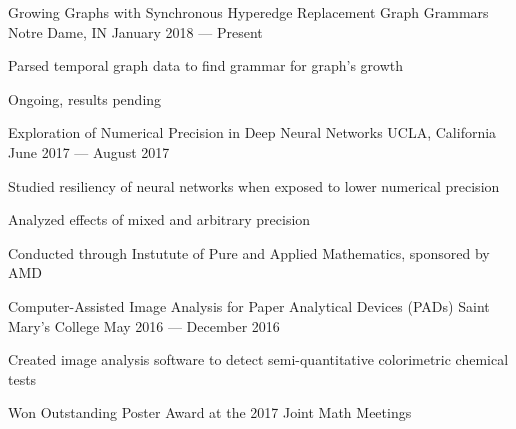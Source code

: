 \begin{cventries}
  {Growing Graphs with Synchronous Hyperedge Replacement Graph Grammars}
  {Notre Dame, IN}
  {January 2018 --- Present}
  {\begin{cvitems}
    \item Parsed temporal graph data to find grammar for graph's growth
    \item Ongoing, results pending
    \end{cvitems}
  }
  {Exploration of Numerical Precision in Deep Neural Networks}
  {UCLA, California}
  {June 2017 --- August 2017}
  {\begin{cvitems}
    \item Studied resiliency of neural networks when exposed to lower numerical precision
    \item Analyzed effects of mixed and arbitrary precision
    \item Conducted through Instutute of Pure and Applied Mathematics, sponsored by AMD
    \end{cvitems}
  }
  {Computer-Assisted Image Analysis for Paper Analytical Devices (PADs)}
  {Saint Mary's College}
  {May 2016 --- December 2016}
  {\begin{cvitems}
    \item {Created image analysis software to detect semi-quantitative colorimetric chemical tests}
    \item {Won Outstanding Poster Award at the 2017 Joint Math Meetings}
    \end{cvitems}
  }
\end{cventries}
